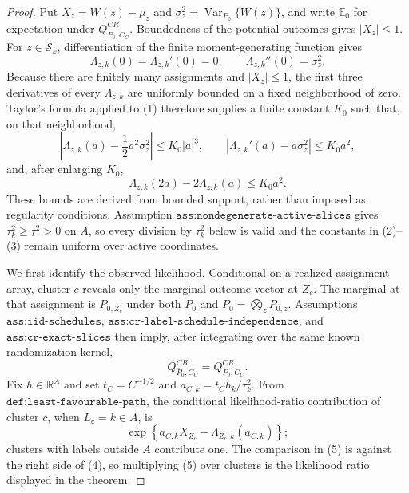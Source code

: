\documentclass{article}
\begin{document}
\begin{proof}
Put \(X_z=W(z)-\mu_z\) and \(\sigma_z^2=\operatorname{Var}_{P_0}\{W(z)\}\), and write \(\mathbb E_0\) for expectation under \(Q^{CR}_{P_0,C_C}\).  Boundedness of the potential outcomes gives \(|X_z|\leq1\).  For \(z\in\mathcal S_k\), differentiation of the finite moment-generating function gives
\[
 \Lambda_{z,k}(0)=\Lambda_{z,k}'(0)=0,
 \qquad \Lambda_{z,k}''(0)=\sigma_z^2.                    \tag{1}
\]
Because there are finitely many assignments and \(|X_z|\leq1\), the first three derivatives of every \(\Lambda_{z,k}\) are uniformly bounded on a fixed neighborhood of zero.  Taylor's formula applied to (1) therefore supplies a finite constant \(K_0\) such that, on that neighborhood,
\[
 \left|\Lambda_{z,k}(a)-\frac12a^2\sigma_z^2\right|
 \leq K_0|a|^3,
 \qquad
 \left|\Lambda_{z,k}'(a)-a\sigma_z^2\right|
 \leq K_0a^2,                                                   \tag{2}
\]
and, after enlarging \(K_0\),
\[
 \Lambda_{z,k}(2a)-2\Lambda_{z,k}(a)\leq K_0a^2.          \tag{3}
\]
These bounds are derived from bounded support, rather than imposed as regularity conditions.  Assumption \(\texttt{ass:nondegenerate-active-slices}\) gives \(\tau_k^2\geq\underline\tau^2>0\) on \(A\), so every division by \(\tau_k^2\) below is valid and the constants in (2)--(3) remain uniform over active coordinates.

We first identify the observed likelihood.  Conditional on a realized assignment array, cluster \(c\) reveals only the marginal outcome vector at \(Z_c\).  The marginal at that assignment is \(P_{0,Z_c}\) under both \(P_0\) and \(\bar P_0=\bigotimes_zP_{0,z}\).  Assumptions \(\texttt{ass:iid-schedules}\), \(\texttt{ass:cr-label-schedule-independence}\), and \(\texttt{ass:cr-exact-slices}\) then imply, after integrating over the same known randomization kernel,
\[
 Q^{CR}_{\bar P_0,C_C}=Q^{CR}_{P_0,C_C}.                  \tag{4}
\]
Fix \(h\in\mathbb R^A\) and set \(t_C=C^{-1/2}\) and
\(a_{C,k}=t_Ch_k/\tau_k^2\).  From \(\texttt{def:least-favourable-path}\), the conditional likelihood-ratio contribution of cluster \(c\), when \(L_c=k\in A\), is
\[
 \exp\!\left\{a_{C,k}X_{Z_c}
              -\Lambda_{Z_c,k}(a_{C,k})\right\};               \tag{5}
\]
clusters with labels outside \(A\) contribute one.  The comparison in (5) is against the right side of (4), so multiplying (5) over clusters is the likelihood ratio displayed in the theorem.


\end{proof}
\end{document}
